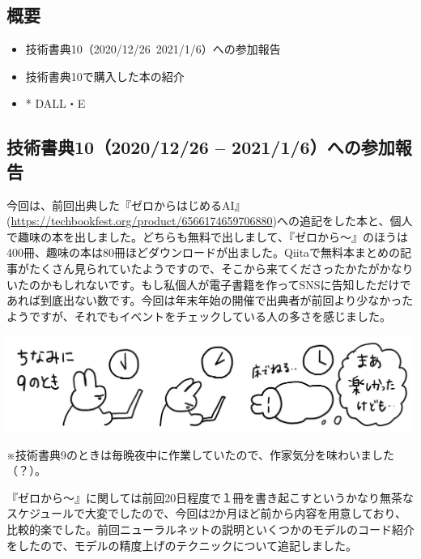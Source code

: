 \documentclass[dvipdfmx,autodetect-engine,10pt,b5paper,papersize,openany,dvipsnames]{jsbook}
\begin{document}
\begin{multicols}{2}

\subsection*{概要}
\begin{itemize}
\item 技術書典10（2020/12/26~2021/1/6）への参加報告
\item 技術書典10で購入した本の紹介
\item* DALL・E
\end{itemize}

\subsection*{技術書典10（2020/12/26 -- 2021/1/6）への参加報告}
今回は、前回出典した『ゼロからはじめるAI』(\url{https://techbookfest.org/product/6566174659706880})への追記をした本と、個人で趣味の本を出しました。どちらも無料で出しまして、『ゼロから～』のほうは400冊、趣味の本は80冊ほどダウンロードが出ました。Qiitaで無料本まとめの記事がたくさん見られていたようですので、そこから来てくださったかたがかなりいたのかもしれないです。もし私個人が電子書籍を作ってSNSに告知しただけであれば到底出ない数です。今回は年末年始の開催で出典者が前回より少なかったようですが、それでもイベントをチェックしている人の多さを感じました。
 
\end{multicols}


\includegraphics[width=\textwidth]{images/202101/newsletter202102_1.png}
\begin{center}
  ※技術書典9のときは毎晩夜中に作業していたので、作家気分を味わいました（？）。
\end{center}


\begin{multicols}{2}
『ゼロから～』に関しては前回20日程度で１冊を書き起こすというかなり無茶なスケジュールで大変でしたので、今回は2か月ほど前から内容を用意しており、比較的楽でした。前回ニューラルネットの説明といくつかのモデルのコード紹介をしたので、モデルの精度上げのテクニックについて追記しました。

\end{multicols}
\end{document}
